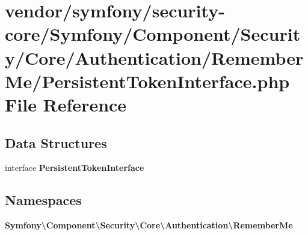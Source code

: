 \section{vendor/symfony/security-\/core/\+Symfony/\+Component/\+Security/\+Core/\+Authentication/\+Remember\+Me/\+Persistent\+Token\+Interface.php File Reference}
\label{_persistent_token_interface_8php}
\subsection*{Data Structures}
\begin{DoxyCompactItemize}
\item 
interface {\bf Persistent\+Token\+Interface}
\end{DoxyCompactItemize}
\subsection*{Namespaces}
\begin{DoxyCompactItemize}
\item 
 {\bf Symfony\textbackslash{}\+Component\textbackslash{}\+Security\textbackslash{}\+Core\textbackslash{}\+Authentication\textbackslash{}\+Remember\+Me}
\end{DoxyCompactItemize}
